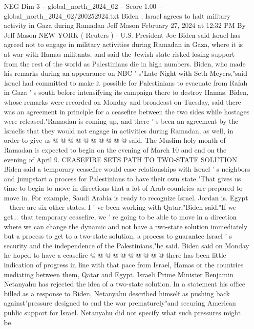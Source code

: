\begin{textsample}{NEG Dim 3 – global\_north\_2024\_02 – Score 1.00 – global\_north\_2024\_02/200252924.txt}  \label{ex:f3_neg_206}
Biden : Israel agrees to halt military activity in Gaza during Ramadan Jeff Mason February 27, 2024 at 12:32 PM By Jeff Mason NEW YORK ( Reuters ) - U.S.
President Joe Biden said Israel has agreed not to engage in military activities during Ramadan in Gaza, where it is at war with Hamas militants, and said the Jewish state risked losing support from the rest of the world as Palestinians die in high numbers.
Biden, who made his remarks during an appearance on NBC ' s"Late Night with Seth Meyers,"said Israel had committed to make it possible for Palestinians to evacuate from Rafah in Gaza ' s south before intensifying its campaign there to destroy Hamas.
Biden, whose remarks were recorded on Monday and broadcast on Tuesday, said there was an agreement in principle for a ceasefire between the two sides while hostages were released."Ramadan is coming up, and there ' s been an agreement by the Israelis that they would not engage in activities during Ramadan, as well, in order to give us @ @ @ @ @ @ @ @ @ @ said.
The Muslim holy month of Ramadan is expected to begin on the evening of March 10 and end on the evening of April 9.
CEASEFIRE SETS PATH TO TWO-STATE SOLUTION Biden said a temporary ceasefire would ease relationships with Israel ' s neighbors and jumpstart a process for Palestinians to have their own state."That gives us time to begin to move in directions that a lot of Arab countries are prepared to move in.
For example, Saudi Arabia is ready to recognize Israel.
Jordan is.
Egypt -- there are six other states.
I ' ve been working with Qatar,"Biden said."If we get... that temporary ceasefire, we ' re going to be able to move in a direction where we can change the dynamic and not have a two-state solution immediately but a process to get to a two-state solution, a process to guarantee Israel ' s security and the independence of the Palestinians,"he said.
Biden said on Monday he hoped to have a ceasefire @ @ @ @ @ @ @ @ @ @ there has been little indication of progress in line with that pace from Israel, Hamas or the countries mediating between them, Qatar and Egypt.
Israeli Prime Minister Benjamin Netanyahu has rejected the idea of a two-state solution.
In a statement his office billed as a response to Biden, Netanyahu described himself as pushing back against"pressure designed to end the war prematurely"and securing American public support for Israel.
Netanyahu did not specify what such pressures might be.

\end{textsample}
